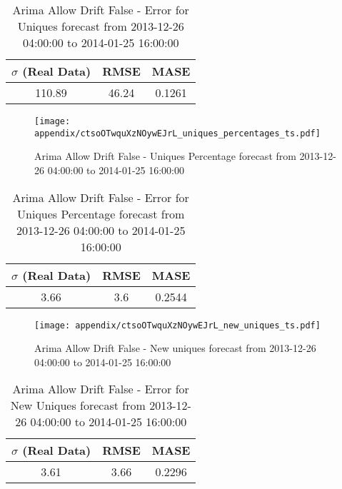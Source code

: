 \begin{table}[H]
\centering
\footnotesize
\begin{tabular}{ccc}
$\sigma$ (Real Data) & RMSE & MASE   \\ \hline
110.89 & 46.24 & 0.1261 \\
\end{tabular}

\vspace{0.5cm}

\caption[]{
Arima Allow Drift False - Error for Uniques forecast from 2013-12-26 04:00:00 to 2014-01-25 16:00:00}
\end{table}

\begin{figure}[H] \begin{center} \leavevmode
\texttt{[image: appendix/ctsoOTwquXzNOywEJrL\_uniques\_percentages\_ts.pdf]} \caption[]{
Arima Allow Drift False - Uniques Percentage forecast from 2013-12-26 04:00:00 to 2014-01-25 16:00:00} \label{fig:appendix/ctsoOTwquXzNOywEJrL_uniques_percentages_ts.pdf} \end{center}
\end{figure}

\begin{table}[H]
\centering
\footnotesize
\begin{tabular}{ccc}
$\sigma$ (Real Data) & RMSE & MASE   \\ \hline
3.66 & 3.6 & 0.2544 \\
\end{tabular}

\vspace{0.5cm}

\caption[]{
Arima Allow Drift False - Error for Uniques Percentage forecast from 2013-12-26 04:00:00 to 2014-01-25 16:00:00}
\end{table}

\begin{figure}[H] \begin{center} \leavevmode
\texttt{[image: appendix/ctsoOTwquXzNOywEJrL\_new\_uniques\_ts.pdf]} \caption[]{
Arima Allow Drift False - New uniques forecast from 2013-12-26 04:00:00 to 2014-01-25 16:00:00} \label{fig:appendix/ctsoOTwquXzNOywEJrL_new_uniques_ts.pdf} \end{center}
\end{figure}

\begin{table}[H]
\centering
\footnotesize
\begin{tabular}{ccc}
$\sigma$ (Real Data) & RMSE & MASE   \\ \hline
3.61 & 3.66 & 0.2296 \\
\end{tabular}

\vspace{0.5cm}

\caption[]{
Arima Allow Drift False - Error for New Uniques forecast from 2013-12-26 04:00:00 to 2014-01-25 16:00:00}
\end{table}

